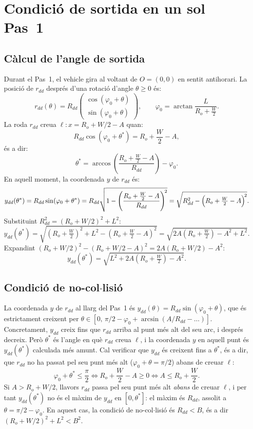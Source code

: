 \documentclass[11pt, a4paper]{article}
\theoremstyle{plain}
\theoremstyle{definition}
\newcommand{\Ro}{R_o}
\begin{document}
\section{Condici\'o de sortida en un sol Pas~1}\label{sec:1pas}

\subsection{C\`alcul de l'angle de sortida}

Durant el Pas~1, el vehicle gira al voltant de $O=(0,0)$ en sentit antihorari.
La posici\'o de $r_{dd}$ despr\'es d'una rotaci\'o d'angle $\theta\geq 0$ \'es:
\[
  r_{dd}(\theta) = R_{dd}
  \begin{pmatrix}\cos(\varphi_0+\theta)\\\sin(\varphi_0+\theta)\end{pmatrix},
  \qquad
  \varphi_0 = \arctan\!\frac{L}{\Ro+\tfrac{W}{2}}.
\]
La roda $r_{dd}$ creua $\ell: x=\Ro+W/2-A$ quan:
\[
  R_{dd}\cos(\varphi_0+\theta^*) = \Ro+\frac{W}{2}-A,
\]
\'es a dir:
\[
  \theta^* = \arccos\!\left(\frac{\Ro+\tfrac{W}{2}-A}{R_{dd}}\right) - \varphi_0.
\]
En aquell moment, la coordenada $y$ de $r_{dd}$ \'es:
\[
  y_{dd}(\theta^*) = R_{dd}\sin(\varphi_0+\theta^*)
  = R_{dd}\sqrt{1-\left(\frac{\Ro+\tfrac{W}{2}-A}{R_{dd}}\right)^{\!2}}
  = \sqrt{R_{dd}^2 - \Bigl(\Ro+\tfrac{W}{2}-A\Bigr)^{\!2}}.
\]
Substituint $R_{dd}^2 = (\Ro+W/2)^2+L^2$:
\[
  y_{dd}(\theta^*) = \sqrt{(\Ro+\tfrac{W}{2})^2+L^2-(\Ro+\tfrac{W}{2}-A)^2}
  = \sqrt{2A\!\left(\Ro+\tfrac{W}{2}\right)-A^2+L^2}.
\]
Expandint $(\Ro+W/2)^2 - (\Ro+W/2-A)^2 = 2A(\Ro+W/2) - A^2$:
\[
  \boxed{y_{dd}(\theta^*) = \sqrt{L^2 + 2A\!\left(\Ro+\tfrac{W}{2}\right) - A^2}.}
\]

\subsection{Condici\'o de no-col$\cdot$lisi\'o}

La coordenada $y$ de $r_{dd}$ al llarg del Pas~1 \'es
$y_{dd}(\theta)=R_{dd}\sin(\varphi_0+\theta)$, que \'es estrictament creixent
per $\theta\in[0,\,\pi/2-\varphi_0+\arcsin(A/R_{dd}-\ldots)]$.
Concretament, $y_{dd}$ creix fins que $r_{dd}$ arriba al punt m\'es alt del seu
arc, i despr\'es decreix. Per\`o $\theta^*$ \'es l'angle en qu\`e $r_{dd}$
creua $\ell$, i la coordenada $y$ en aquell punt \'es $y_{dd}(\theta^*)$
calculada m\'es amunt. Cal verificar que $y_{dd}$ \'es creixent fins a
$\theta^*$, \'es a dir, que $r_{dd}$ no ha passat pel seu punt m\'es alt
($\varphi_0+\theta=\pi/2$) abans de creuar $\ell$:
\[
  \varphi_0+\theta^* \leq \frac{\pi}{2}
  \iff \Ro+\frac{W}{2}-A \geq 0
  \iff A \leq \Ro+\frac{W}{2}.
\]
Si $A>\Ro+W/2$, llavors $r_{dd}$ passa pel seu punt m\'es alt \emph{abans}
de creuar $\ell$, i per tant $y_{dd}(\theta^*)$ no \'es el m\`axim de $y_{dd}$
en $[0,\theta^*]$: el m\`axim \'es $R_{dd}$, assolit a $\theta=\pi/2-\varphi_0$.
En aquest cas, la condici\'o de no-col$\cdot$lisi\'o \'es $R_{dd}<B$, \'es a
dir $(\Ro+W/2)^2+L^2<B^2$.
\end{document}
